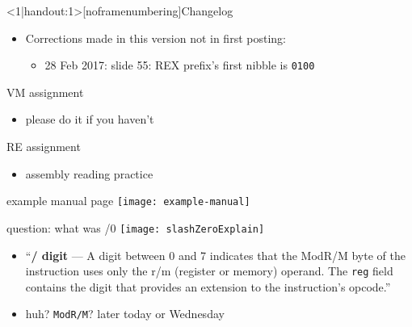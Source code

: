 \begin{frame}
    \titlepage
\end{frame}

{
\begin{frame}<1|handout:1>[noframenumbering]{Changelog}
    \begin{itemize}
        \item Corrections made in this version not in first posting:
        \begin{itemize}
        \item 28 Feb 2017: slide 55: REX prefix's first nibble is {\tt 0100}
        \end{itemize}
    \end{itemize}
\end{frame}
}

\begin{frame}{VM assignment}
    \begin{itemize}
    \item please do it if you haven't
    \end{itemize}
\end{frame}

\begin{frame}{RE assignment}
    \begin{itemize}
    \item assembly reading practice
    \end{itemize}
\end{frame}

\begin{frame}{example manual page}
\texttt{[image: example-manual]}
\end{frame}

\begin{frame}{question: what was /0}
    \texttt{[image: slashZeroExplain]}
    \begin{itemize}
    \item ``{\bfseries / digit} --- A digit between 0 and 7 indicates that the ModR/M byte of the instruction uses only the r/m (register or memory) operand. The {\tt reg} field contains the digit that provides an extension to the instruction's opcode.''
    \item huh? {\tt ModR/M}? later today or Wednesday 
    \end{itemize}
\end{frame}

